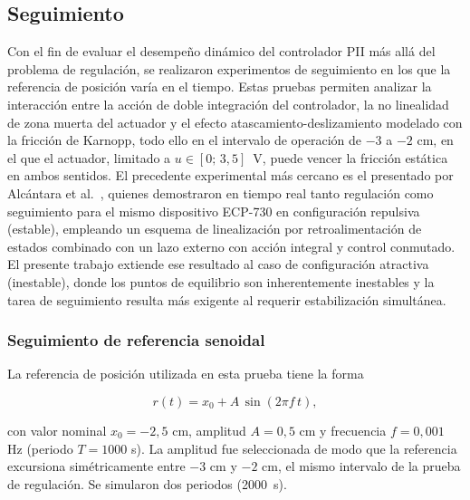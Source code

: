 \subsection{Seguimiento}

Con el fin de evaluar el desempeño dinámico del controlador PII más allá del problema de regulación,
se realizaron experimentos de seguimiento en los que la referencia de posición varía en el tiempo.
Estas pruebas permiten analizar la interacción entre la acción de doble integración del controlador,
la no linealidad de zona muerta del actuador y el efecto atascamiento-deslizamiento modelado con
la fricción de Karnopp, todo ello en el intervalo de operación de $-3$ a $-2$ cm, en el que el actuador, limitado a $u\in[0;\,3{,}5]$~V, puede vencer la fricción estática en ambos sentidos.
El precedente experimental más cercano es el presentado por Alcántara et al.\ \cite{alcantara},
quienes demostraron en tiempo real tanto regulación como seguimiento para el mismo dispositivo
ECP-730 en configuración repulsiva (estable), empleando un esquema de linealización por
retroalimentación de estados combinado con un lazo externo con acción integral y control conmutado.
El presente trabajo extiende ese resultado al caso de configuración atractiva (inestable),
donde los puntos de equilibrio son inherentemente inestables y la tarea de seguimiento resulta
más exigente al requerir estabilización simultánea.

\subsubsection{Seguimiento de referencia senoidal}

La referencia de posición utilizada en esta prueba tiene la forma

\begin{equation}
  r(t) = x_0 + A\,\sin(2\pi f\, t),
  \label{eq:ref_senoidal}
\end{equation}

con valor nominal $x_0 = -2{,}5$ cm, amplitud $A = 0{,}5$ cm y frecuencia $f = 0{,}001$ Hz
(periodo $T = 1000$ s).
La amplitud fue seleccionada de modo que la referencia excursiona simétricamente entre
$-3$ cm y $-2$ cm, el mismo intervalo de la prueba de regulación. Se simularon dos periodos (2000~s).

